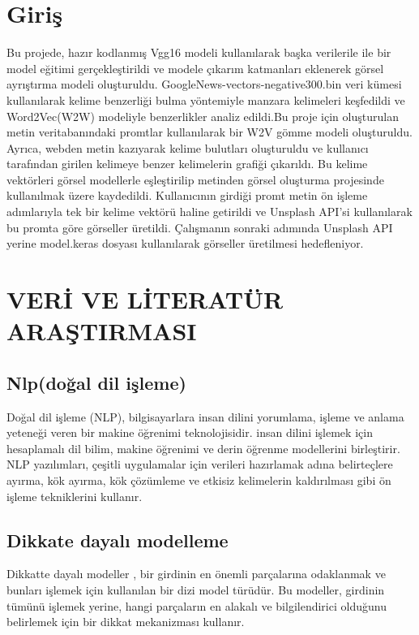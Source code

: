 \documentclass[12pt, a4paper]{article}
\begin{document}
	\section{Giriş}
		Bu projede, hazır kodlanmış Vgg16 modeli kullanılarak başka verilerile ile bir model eğitimi gerçekleştirildi ve modele çıkarım katmanları eklenerek görsel ayrıştırma modeli oluşturuldu. GoogleNews-vectors-negative300.bin veri kümesi kullanılarak kelime benzerliği bulma yöntemiyle manzara kelimeleri keşfedildi ve Word2Vec(W2W) modeliyle benzerlikler analiz edildi.Bu proje için oluşturulan metin veritabanındaki promtlar kullanılarak bir W2V gömme modeli oluşturuldu. Ayrıca, webden metin kazıyarak kelime bulutları oluşturuldu ve kullanıcı tarafından girilen kelimeye benzer kelimelerin grafiği çıkarıldı. Bu kelime vektörleri görsel modellerle eşleştirilip metinden görsel oluşturma projesinde kullanılmak üzere kaydedildi. Kullanıcının girdiği promt metin ön işleme adımlarıyla tek bir kelime vektörü haline getirildi ve Unsplash API'si kullanılarak bu promta göre görseller üretildi. Çalışmanın sonraki adımında Unsplash API yerine model.keras dosyası kullanılarak görseller üretilmesi hedefleniyor.
	
	\section{VERİ VE LİTERATÜR ARAŞTIRMASI}
	
	\subsection{Nlp(doğal dil işleme)}		
	Doğal dil işleme (NLP), bilgisayarlara insan dilini yorumlama, işleme ve anlama yeteneği veren bir makine öğrenimi teknolojisidir. insan dilini işlemek için hesaplamalı dil bilim, makine öğrenimi ve derin öğrenme modellerini birleştirir. NLP yazılımları, çeşitli uygulamalar için verileri hazırlamak adına belirteçlere ayırma, kök ayırma, kök çözümleme ve etkisiz kelimelerin kaldırılması gibi ön işleme tekniklerini kullanır.	 
	
	\subsection{Dikkate dayalı modelleme}	
	Dikkatte dayalı modeller , bir girdinin en önemli parçalarına odaklanmak ve bunları işlemek için kullanılan bir dizi model türüdür. Bu modeller, girdinin tümünü işlemek yerine, hangi parçaların en alakalı ve bilgilendirici olduğunu belirlemek için bir dikkat mekanizması kullanır.\cite{Dikkate-dayalı-modelleme}
	
\end{document}

